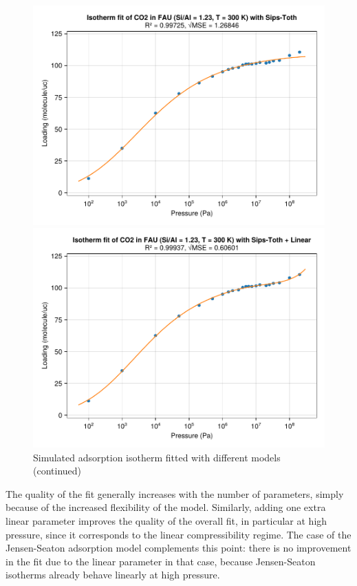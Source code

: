 \documentclass[main.tex]{subfiles}
\begin{document}
\begin{figure}
	\begin{minipage}{0.49\columnwidth}
		\includegraphics[width=\columnwidth]{figures/isotherms/Sips-Toth.pdf}
	\end{minipage}\hfill%
	\begin{minipage}{0.49\columnwidth}
		\includegraphics[width=\columnwidth]{figures/isotherms/Sips-Toth + Linear.pdf}
	\end{minipage}
	\caption{Simulated adsorption isotherm fitted with different models (continued)}
\end{figure}

The quality of the fit generally increases with the number of parameters, simply because of the increased flexibility of the model. Similarly, adding one extra linear parameter improves the quality of the overall fit, in particular at high pressure, since it corresponds to the linear compressibility regime. The case of the Jensen-Seaton adsorption model complements this point: there is no improvement in the fit due to the linear parameter in that case, because Jensen-Seaton isotherms already behave linearly at high pressure.
\end{document}
